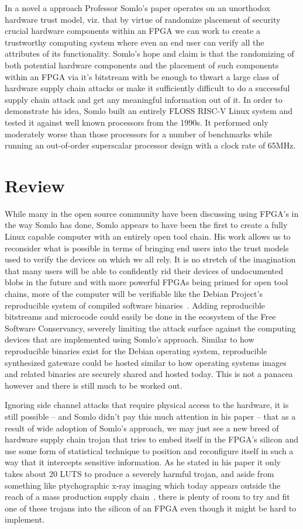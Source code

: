\documentclass[conference]{IEEEtran}
\begin{document}
	In a novel a approach Professor Somlo’s paper operates on an unorthodox hardware trust model, viz. that by virtue of randomize placement of security crucial hardware components within an FPGA we can work to create a trustworthy computing system where even an end user can verify all the attributes of its functionality. Somlo’s hope and claim is that the randomizing of both potential hardware components and the placement of such components within an FPGA via it’s bitstream with be enough to thwart a large class of hardware supply chain attacks or make it sufficiently difficult to do a successful supply chain attack and get any meaningful information out of it. In order to demonstrate his idea, Somlo built an entirely FLOSS RISC-V Linux system and tested it against well known processors from the 1990s. It performed only moderately worse than those processors for a number of benchmarks while running an out-of-order superscalar processor design with a clock rate of 65MHz.
	
	\section{Review}
	While many in the open source community have been discussing using FPGA’s in the way Somlo has done, Somlo appears to have been the first to create a fully Linux capable computer with an entirely open tool chain. His work allows us to reconsider what is possible in terms of bringing end users into the trust models used to verify the devices on which we all rely. It is no stretch of the imagination that many users will be able to confidently rid their devices of undocumented blobs in the future and with more powerful FPGAs being primed for open tool chains, more of the computer will be verifiable like the Debian Project’s reproducible system of compiled software binaries~\cite{reproducible}. Adding reproducible bitstreams and microcode could easily be done in the ecosystem of the Free Software Conservancy, severely limiting the attack surface against the computing devices that are implemented using Somlo’s approach. Similar to how reproducible binaries exist for the Debian operating system, reproducible synthesized gateware could be hosted similar to how operating systems images and related binaries are securely shared and hosted today. This is not a panacea however and there is still much to be worked out.
	
	Ignoring side channel attacks that require physical access to the hardware, it is still possible – and Somlo didn’t pay this much attention in his paper – that as a result of wide adoption of Somlo’s approach, we may just see a new breed of hardware supply chain trojan that tries to embed itself in the FPGA’s silicon and use some form of statistical technique to position and reconfigure itself in such a way that it intercepts sensitive information. As he stated in his paper it only takes about 20 LUTS to produce a severely harmful trojan, and aside from something like ptychographic x-ray imaging which today appears outside the reach of a mass production supply chain~\cite{holler}, there is plenty of room to try and fit one of these trojans into the silicon of an FPGA even though it might be hard to implement.
	
\end{document}
